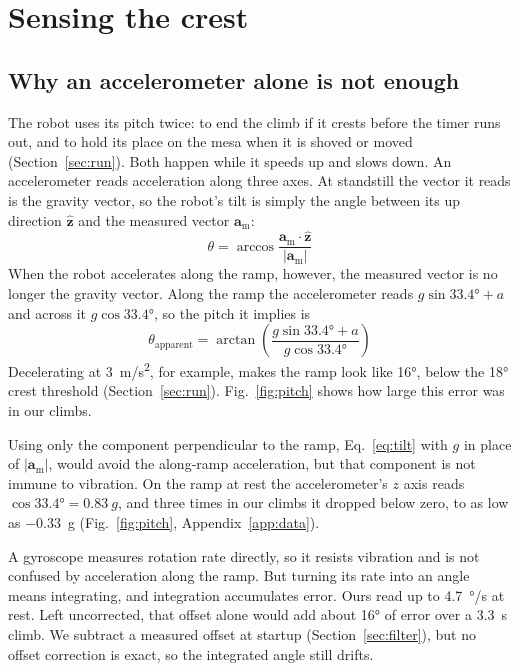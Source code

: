\section{Sensing the crest}
\label{sec:sensing}

\subsection{Why an accelerometer alone is not enough}
\label{sec:accel-only}

The robot uses its pitch twice: to end the climb if it crests before the timer runs out, and to hold its place on the mesa when it is shoved or moved (Section~\ref{sec:run}). Both happen while it speeds up and slows down. An accelerometer reads acceleration along three axes. At standstill the vector it reads is the gravity vector, so the robot's tilt is simply the angle between its up direction $\hat{\bm{z}}$ and the measured vector $\bm{a}_\mathrm{m}$:
\begin{equation}
  \theta = \arccos\frac{\bm{a}_\mathrm{m} \cdot \hat{\bm{z}}}{|\bm{a}_\mathrm{m}|}
  \label{eq:tilt}
\end{equation}
When the robot accelerates along the ramp, however, the measured vector is no longer the gravity vector. Along the ramp the accelerometer reads $g \sin\ang{33.4} + a$ and across it $g \cos\ang{33.4}$, so the pitch it implies is
\begin{equation}
  \theta_\mathrm{apparent} = \arctan\!\left(\frac{g \sin\ang{33.4} + a}{g \cos\ang{33.4}}\right)
  \label{eq:apparent}
\end{equation}
Decelerating at \qty{3}{m/s^2}, for example, makes the ramp look like \ang{16}, below the \ang{18} crest threshold (Section~\ref{sec:run}). Fig.~\ref{fig:pitch} shows how large this error was in our climbs.

Using only the component perpendicular to the ramp, Eq.~\eqref{eq:tilt} with $g$ in place of $|\bm{a}_\mathrm{m}|$, would avoid the along-ramp acceleration, but that component is not immune to vibration. On the ramp at rest the accelerometer's $z$ axis reads $\cos\ang{33.4} = \qty{0.83}{g}$, and three times in our climbs it dropped below zero, to as low as \qty{-0.33}{g} (Fig.~\ref{fig:pitch}, Appendix~\ref{app:data}).

A gyroscope measures rotation rate directly, so it resists vibration and is not confused by acceleration along the ramp. But turning its rate into an angle means integrating, and integration accumulates error. Ours read up to \qty{4.7}{\degree/s} at rest. Left uncorrected, that offset alone would add about \ang{16} of error over a \qty{3.3}{s} climb. We subtract a measured offset at startup (Section~\ref{sec:filter}), but no offset correction is exact, so the integrated angle still drifts.

